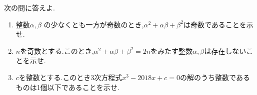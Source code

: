 \begin{problem}
次の問に答えよ.
  \begin{enumerate}
    \item 整数$\alpha,\beta$ の少なくとも一方が奇数のとき,$\alpha^2+\alpha\beta+\beta^2$は奇数であることを示せ.
    \item $n$を奇数とする.このとき,$\alpha^2+\alpha\beta+\beta^2=2n$をみたす整数$\alpha,\beta$は存在しないことを示せ.
    \item $c$を整数とする.このとき3次方程式$x^3-2018x+c=0$の解のうち整数であるものは1個以下であることを示せ.
  \end{enumerate}
\end{problem}
